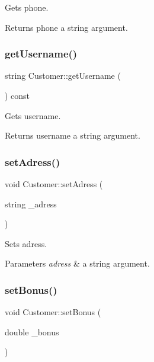 Gets phone. 

\begin{DoxyReturn}{Returns}
phone a string argument. 
\end{DoxyReturn}
\mbox{\label{classCustomer_aebc1f8d2d749c3f5d132becad88dcbc6}} 
\subsubsection{\texorpdfstring{get\+Username()}{getUsername()}}
{\footnotesize\ttfamily string Customer\+::get\+Username (\begin{DoxyParamCaption}{ }\end{DoxyParamCaption}) const}



Gets username. 

\begin{DoxyReturn}{Returns}
username a string argument. 
\end{DoxyReturn}
\mbox{\label{classCustomer_adfc9ac7abfa4bb4835106dc35739a4a6}} 
\subsubsection{\texorpdfstring{set\+Adress()}{setAdress()}}
{\footnotesize\ttfamily void Customer\+::set\+Adress (\begin{DoxyParamCaption}\item[{string}]{\+\_\+adress }\end{DoxyParamCaption})}



Sets adress. 


\begin{DoxyParams}{Parameters}
{\em adress} & a string argument. \\
\hline
\end{DoxyParams}
\mbox{\label{classCustomer_af983714f01880a3f082c60443fcea84d}} 
\subsubsection{\texorpdfstring{set\+Bonus()}{setBonus()}}
{\footnotesize\ttfamily void Customer\+::set\+Bonus (\begin{DoxyParamCaption}\item[{double}]{\+\_\+bonus }\end{DoxyParamCaption})}



